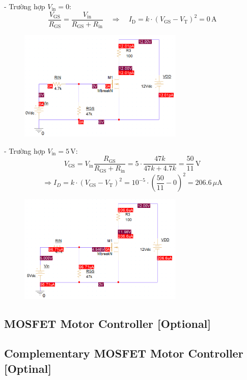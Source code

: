 - Trường hợp \( V_{\text{in}} = 0 \):
\[
\frac{V_{\text{GS}}}{R_{\text{GS}}} = \frac{V_{\text{in}}}{R_{\text{GS}} + R_{\text{in}}} \quad \Rightarrow \quad I_\text{D} = k \cdot (V_\text{GS} - V_{\text{T}})^2 = 0 \, \text{A}
\]
\begin{figure}[!htp]
    \centering
    \includegraphics[width=0.7\textwidth]{graphics/ex3/f2.PNG}
\end{figure}

- Trường hợp \( V_{\text{in}} = 5 \, \text{V}\):
\[
V_\text{GS} =V_\text{in} \frac{R_\text{GS}}{R_{\text{GS}} + R_{\text{in}}} = 5 \cdot \frac{47k}{47k+4.7k} = \frac{50}{11}\, \text{V}
\]
\[
\Rightarrow I_D = k \cdot (V_\text{GS} - V_{\text{T}})^2 = 10^{-5}\cdot \left (\frac{50}{11} - 0 \right ) ^2 = 206.6 \, \mu\text{A}
\]
\begin{figure}[!htp]
    \centering
    \includegraphics[width=0.7\textwidth]{graphics/ex3/f3.PNG}
\end{figure}






\subsection{MOSFET Motor Controller [Optional]}
\subsection{Complementary MOSFET Motor Controller [Optinal]}
